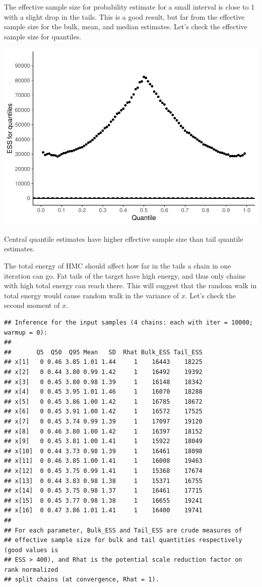 \documentclass[american,]{article}
\begin{document}
The effective sample size for probability estimate for a small interval
is close to 1 with a slight drop in the tails. This is a good result,
but far from the effective sample size for the bulk, mean, and median
estimates. Let's check the effective sample size for quantiles.

\includegraphics{graphics/quantile-ess-fit-n-1.pdf}

Central quantile estimates have higher effective sample size than tail
quantile estimates.

The total energy of HMC should affect how far in the tails a chain in
one iteration can go. Fat tails of the target have high energy, and thus
only chains with high total energy can reach there. This will suggest
that the random walk in total energy would cause random walk in the
variance of \(x\). Let's check the second moment of \(x\).

\begin{verbatim}
## Inference for the input samples (4 chains: each with iter = 10000; warmup = 0):
## 
##       Q5  Q50  Q95 Mean   SD  Rhat Bulk_ESS Tail_ESS
## x[1]   0 0.46 3.85 1.01 1.44     1    16443    18225
## x[2]   0 0.44 3.80 0.99 1.42     1    16492    19392
## x[3]   0 0.45 3.80 0.98 1.39     1    16148    18342
## x[4]   0 0.45 3.95 1.01 1.46     1    16070    18288
## x[5]   0 0.45 3.86 1.00 1.42     1    16785    18672
## x[6]   0 0.45 3.91 1.00 1.42     1    16572    17525
## x[7]   0 0.45 3.74 0.99 1.39     1    17097    19120
## x[8]   0 0.46 3.80 1.00 1.42     1    16397    18152
## x[9]   0 0.45 3.81 1.00 1.41     1    15922    18049
## x[10]  0 0.44 3.73 0.98 1.39     1    16461    18098
## x[11]  0 0.46 3.85 1.00 1.41     1    16008    19463
## x[12]  0 0.45 3.75 0.99 1.41     1    15368    17674
## x[13]  0 0.44 3.83 0.98 1.38     1    15371    16755
## x[14]  0 0.45 3.75 0.98 1.37     1    16461    17715
## x[15]  0 0.45 3.77 0.98 1.38     1    16655    19241
## x[16]  0 0.47 3.86 1.01 1.41     1    16400    19741
## 
## For each parameter, Bulk_ESS and Tail_ESS are crude measures of 
## effective sample size for bulk and tail quantities respectively (good values is 
## ESS > 400), and Rhat is the potential scale reduction factor on rank normalized
## split chains (at convergence, Rhat = 1).
\end{verbatim}
\end{document}
